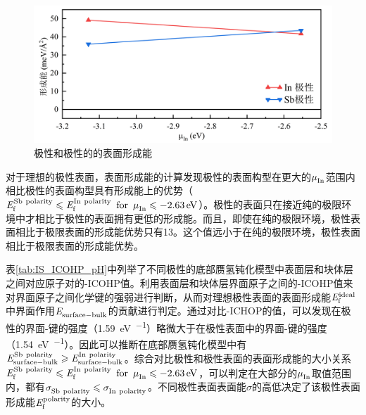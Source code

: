 \begin{figure}[htb]
    \includegraphics{pic/IS_DFT_surfaceE_InPSbP.png}
    \caption{极性和极性的的表面形成能}
    \label{fig:IS_DFT_surfaceE_InPSbP}
\end{figure}

对于理想的极性表面，表面形成能的计算发现极性的表面构型在更大的$\it \mu_{\rm In}^{\rm } \it$范围内相比极性的表面构型具有形成能上的优势（$\it E_{\rm f}^{\rm Sb\ polarity} \it \leqslant \it E_{\rm f}^{\rm In\ polarity} \it\enspace \rm{for} \enspace \it \mu_{\rm In}^{\rm } \it \leqslant \SI{-2.63}{\electronvolt}$）。极性的表面只在接近纯的极限环境中才相比于极性的表面拥有更低的形成能。而且，即使在纯的极限环境，极性表面相比于极限表面的形成能优势只有\SI{13}{\mievpas}。这个值远小于在纯的极限环境，极性表面相比于极限表面的形成能优势。

表\ref{tab:IS_ICOHP_pH}中列举了不同极性的底部赝氢钝化模型中表面层和块体层之间对应原子对的-ICOHP值。利用表面层和块体层界面原子之间的-ICOHP值来对界面原子之间化学键的强弱进行判断，从而对理想极性表面的表面形成能$\it E_{\rm f}^{\rm ideal} \it$中界面作用$\it E_{\rm surface-bulk}^{\rm } \it$的贡献进行判定。通过对比-ICHOP的值，可以发现在极性的界面-键的强度（\SI{1.59}{\electronvolt\per\pair}）略微大于在极性表面中的界面-键的强度（\SI{1.54}{\electronvolt\per\pair}）。因此可以推断在底部赝氢钝化模型中有$\energyVar{surface-bulk}{Sb\ polarity}\geqslant\energyVar{surface-bulk}{In\ polarity}$。综合对比极性和极性表面的表面形成能的大小关系$\it E_{\rm f}^{\rm Sb\ polarity} \it \leqslant \it E_{\rm f}^{\rm In\ polarity} \it\enspace \rm{for} \enspace \it \mu_{\rm In}^{\rm } \it \leqslant \SI{-2.63}{\electronvolt}$，可以判定在大部分的$\it \mu_{\rm In}^{\rm } \it$取值范围内，都有$\sigmaVar{Sb\ polarity}{} \leqslant \sigmaVar{In\ polarity}{}$。不同极性表面表面能$\sigma$的高低决定了该极性表面形成能$\it E_{\rm f}^{\rm polarity} \it$的大小。

